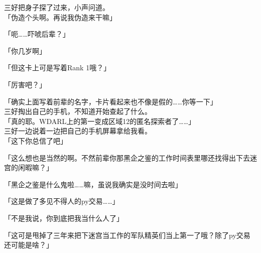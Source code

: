 三好把身子探了过来，小声问道。\\

「伪造个头啊。再说我伪造来干嘛」

「呃……吓唬后辈？」

「你几岁啊」

「但这卡上可是写着Rank 1哦？」

「厉害吧？」

「确实上面写着前辈的名字，卡片看起来也不像是假的……你等一下」\\

三好掏出自己的手机，不知道开始查起了什么。\\

「真的耶。WDARL上的第一变成区域12的匿名探索者了……」\\

三好一边说着一边把自己的手机屏幕拿给我看。\\

「这下你总信了吧」

「这么想也是当然的啊。不然前辈你那黑企之鉴的工作时间表里哪还找得出下去迷宫的闲暇嘛？」

「黑企之鉴是什么鬼啦……嘛，虽说我确实是没时间去啦」

「这是做了多见不得人的py交易……」

「不是我说，你到底把我当什么人了」

「这可是甩掉了三年来把下迷宫当工作的军队精英们当上第一了哦？除了py交易还可能是啥？」

